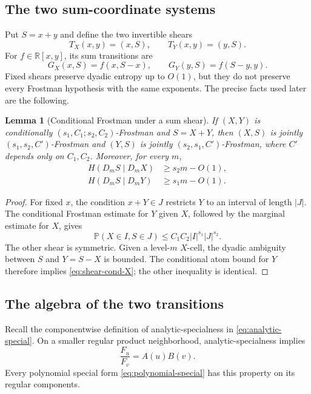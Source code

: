 \documentclass[11pt]{article}
\newtheorem{lemma}[theorem]{Lemma}
\begin{document}
\subsection{The two sum-coordinate systems}

Put \(S=x+y\) and define the two invertible shears
\[
 T_X(x,y)=(x,S),\qquad T_Y(x,y)=(y,S).
\]
For \(f\in\mathbb R[x,y]\), its sum transitions are
\begin{equation}
 G_X(x,S)=f(x,S-x),
 \qquad
 G_Y(y,S)=f(S-y,y).
 \label{eq:sum-transitions}
\end{equation}
Fixed shears preserve dyadic entropy up to \(O(1)\), but they do not
preserve every Frostman hypothesis with the same exponents.  The
precise facts used later are the following.

\begin{lemma}[Conditional Frostman under a sum shear]
\label{lem:conditional-shear}
If \((X,Y)\) is conditionally
\((s_1,C_1;s_2,C_2)\)-Frostman and \(S=X+Y\), then
\((X,S)\) is jointly \((s_1,s_2,C')\)-Frostman and
\((Y,S)\) is jointly \((s_2,s_1,C')\)-Frostman, where
\(C'\) depends only on \(C_1,C_2\).  Moreover, for every \(m\),
\begin{align}
 H(D_mS\mid D_mX)&\ge s_2m-O(1),
 \label{eq:shear-cond-X}\\
 H(D_mS\mid D_mY)&\ge s_1m-O(1).
 \label{eq:shear-cond-Y}
\end{align}
\end{lemma}

\begin{proof}
For fixed \(x\), the condition \(x+Y\in J\) restricts \(Y\) to an
interval of length \(|J|\).  The conditional Frostman estimate for
\(Y\) given \(X\), followed by the marginal estimate for \(X\),
gives
\[
 \mathbb P(X\in I,S\in J)
 \le C_1C_2|I|^{s_1}|J|^{s_2}.
\]
The other shear is symmetric.  Given a level-\(m\) \(X\)-cell, the
dyadic ambiguity between \(S\) and \(Y=S-X\) is bounded.  The
conditional atom bound for \(Y\) therefore implies
\eqref{eq:shear-cond-X}; the other inequality is identical.
\end{proof}

\subsection{The algebra of the two transitions}

Recall the componentwise definition of analytic-specialness in
\eqref{eq:analytic-special}.  On a smaller regular product
neighborhood, analytic-specialness implies
\begin{equation}
 \frac{F_u}{F_v}=A(u)B(v).
 \label{eq:separated-derivative-ratio}
\end{equation}
Every polynomial special form \eqref{eq:polynomial-special} has this
property on its regular components.
\end{document}
